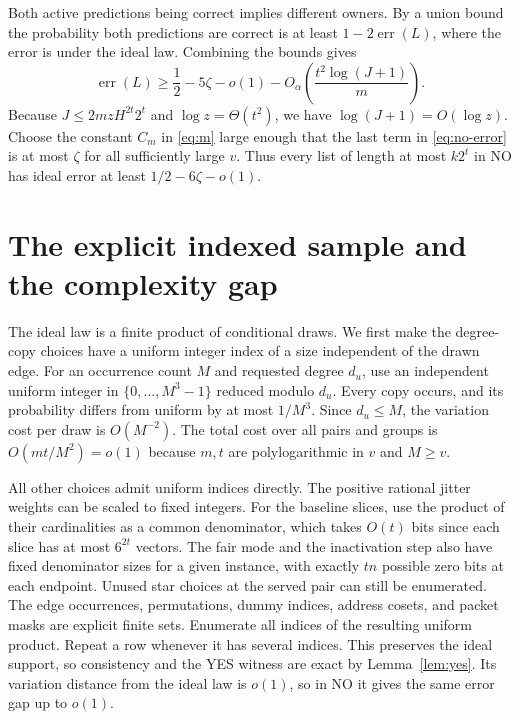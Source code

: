 \documentclass[11pt]{article}
\newcommand{\err}{\operatorname{err}}
\begin{document}
Both active predictions being correct implies different owners.
By a union bound the probability both predictions are correct is
at least $1-2\err(L)$, where the error is under the ideal law.
Combining the bounds gives
\begin{equation}\label{eq:no-error}
  \err(L)\ge \frac12-5\zeta-o(1)
                  -O_\alpha\!\left(\frac{t^2\log(J+1)}{m}\right).
\end{equation}
Because $J\le 2mzH^{2t}2^t$ and $\log z=\Theta(t^2)$,
we have $\log(J+1)=O(\log z)$. Choose the constant $C_m$
in \eqref{eq:m} large enough that the last term in
\eqref{eq:no-error} is at most $\zeta$ for all sufficiently
large $v$. Thus every list of length at most $k2^t$ in NO
has ideal error at least $1/2-6\zeta-o(1)$.

\section{The explicit indexed sample and the complexity gap}\label{sec:size}

The ideal law is a finite product of conditional draws. We first
make the degree-copy choices have a uniform integer index of a
size independent of the drawn edge. For an occurrence count $M$
and requested degree $d_u$, use an independent uniform integer
in $\{0,\ldots,M^3-1\}$ reduced modulo $d_u$. Every copy occurs,
and its probability differs from uniform by at most $1/M^3$.
Since $d_u\le M$, the variation cost per draw is $O(M^{-2})$.
The total cost over all pairs and groups is $O(mt/M^2)=o(1)$
because $m,t$ are polylogarithmic in $v$ and $M\ge v$.

All other choices admit uniform indices directly. The positive
rational jitter weights can be scaled to fixed integers.
For the baseline slices, use the product of their cardinalities
as a common denominator, which takes $O(t)$ bits since each
slice has at most $6^{2t}$ vectors. The fair mode and the
inactivation step also have fixed denominator sizes for a given
instance, with exactly $tn$ possible zero bits at each endpoint.
Unused star choices at the served pair can still be enumerated.
The edge occurrences, permutations, dummy indices, address cosets,
and packet masks are explicit finite sets. Enumerate all indices
of the resulting uniform product. Repeat a row whenever it has
several indices. This preserves the ideal support, so consistency
and the YES witness are exact by Lemma~\ref{lem:yes}. Its variation
distance from the ideal law is $o(1)$, so in NO it gives the same
error gap up to $o(1)$.
\end{document}
